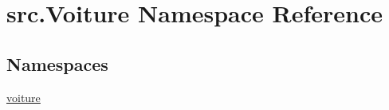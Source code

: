 \hypertarget{namespacesrc_1_1_voiture}{}\section{src.\+Voiture Namespace Reference}
\label{namespacesrc_1_1_voiture}
\subsection*{Namespaces}
\begin{DoxyCompactItemize}
\item 
 \hyperlink{namespacesrc_1_1_voiture_1_1voiture}{voiture}
\end{DoxyCompactItemize}
